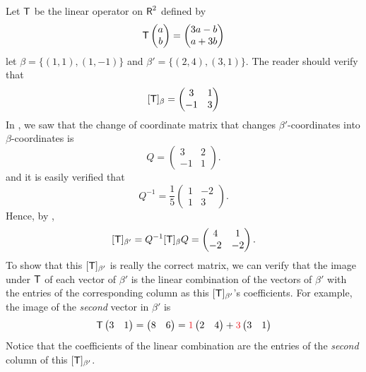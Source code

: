 \begin{example} \label{example 2.5.2}
Let \(\textsf{T}\) be the linear operator on \(\textsf{R}^2\) defined by
\[
    \textsf{T} \begin{pmatrix} a \\ b \end{pmatrix} = \begin{pmatrix} 3a - b \\ a + 3b \end{pmatrix}
\]
let \(\beta = \{ (1, 1), (1, -1) \}\) and \(\beta' = \{ (2, 4), (3, 1) \}\).
The reader should verify that
\[
    [\textsf{T}]_{\beta} = \begin{pmatrix} 3 & 1 \\ -1 & 3 \end{pmatrix}
\]
In , we saw that the change of coordinate matrix that changes \(\beta'\)-coordinates into \(\beta\)-coordinates is
\[
    Q = \begin{pmatrix} 3 & 2 \\ -1 & 1 \end{pmatrix}.
\]
and it is easily verified that
\[
    Q^{-1} = \frac{1}{5} \begin{pmatrix} 1 & -2 \\ 1 & 3 \end{pmatrix}.
\]
Hence, by ,
\[
    [\textsf{T}]_{\beta'} = Q^{-1} [\textsf{T}]_{\beta} Q = \begin{pmatrix} 4 & 1 \\ -2 & -2 \end{pmatrix}.
\]
To show that this \([\textsf{T}]_{\beta'}\) is really the correct matrix, we can verify that the image under \(\textsf{T}\) of each vector of \(\beta'\) is the linear combination of the vectors of \(\beta'\) with the entries of the corresponding column as this \([\textsf{T}]_{\beta'}\)'s coefficients.
For example, the image of the \emph{second} vector in \(\beta'\) is
\[
    \T \begin{pmatrix} 3 & 1 \end{pmatrix} = \begin{pmatrix} 8 & 6 \end{pmatrix} = \RED{1} \begin{pmatrix} 2 & 4 \end{pmatrix} + \RED{3} \begin{pmatrix} 3 & 1 \end{pmatrix}
\]
Notice that the coefficients of the linear combination are the entries of the \emph{second} column of this \([\textsf{T}]_{\beta'}\).
\end{example}

